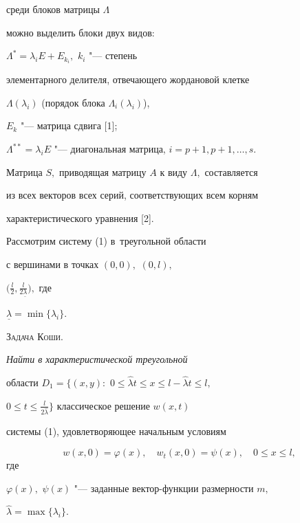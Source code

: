 среди блоков  матрицы $\Lambda$

можно выделить блоки двух видов:



$\Lambda^{*}=\lambda_{i}E+E_{k_{i}},$ $k_{i}$ "--- степень

элементарного делителя, отвечающего жордановой клетке

$\Lambda(\lambda_{i})$ (порядок блока $\Lambda_{i}(\lambda_{i})$),

$E_{k}$ "--- матрица сдвига [1];



$\Lambda^{**}=\lambda_{i}E$ "--- диагональная матрица, $i=p+1, p+1, \dots, s .$



Матрица $S,$ приводящая матрицу $A$ к виду $\Lambda,$ составляется

из всех векторов всех серий, соответствующих всем корням

характеристического уравнения [2].





 Рассмотрим систему (1) в~треугольной области  

с вершинами в точках $(0, 0),$ $(0, l),$

$\bigl(\frac{l}{2}, \frac{l}{2\underline{\lambda}}\bigr),$ где

$\underline{\lambda}=\min\{\lambda_{i}\}.$



\textsc{\small Задача Коши}. {\it Найти в характеристической треугольной

области $D_{1}=\big\{(x, y){:}$ $0\leqslant \widehat{\lambda}t\leqslant x \leqslant l-\widehat{\lambda}t \leqslant l,$

$0\leqslant t \leqslant \frac{l}{2\widehat{\lambda}}\big\}$ классическое решение $w(x, t)$

системы {\rm (1)}, удовлетворяющее  начальным условиям

\begin{equation} 

w(x, 0)=\varphi(x),\quad

w_{t}(x, 0)=\psi(x),\quad 

0\leqslant x\leqslant l, 

\end{equation} где

$\varphi(x),$ $\psi(x)$ "--- заданные вектор-функции размерности $m,$

$\widehat{\lambda}=\max\{\lambda_{i}\}.$

}



